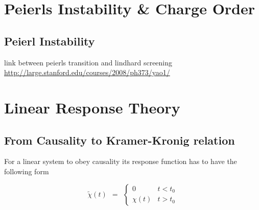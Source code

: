 \documentclass[10pt]{report}
\numberwithin{equation}{chapter}
\begin{document}
%


\chapter{Peierls Instability \& Charge Order}

\section{Peierl Instability}


link between peierls transition and lindhard screening 
\url{http://large.stanford.edu/courses/2008/ph373/yao1/}

%

\chapter{Linear Response Theory}

\section{From Causality to Kramer-Kronig relation}


For a linear system to obey causality its response function has to have the following form

\begin{equation} \label{eq:response_causality}
  \tilde{\chi}(t) ~~ = ~~ \left\{ \begin{array}{lc} 
    0        &  t < t_0 \\
    \chi(t)  &  t > t_0
  \end{array}\right.
\end{equation}
\end{document}
